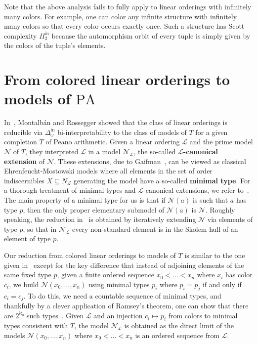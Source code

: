 \documentclass[11pt]{amsart}
\newcommand{\N}{\mathcal{N}}
\newcommand{\mc}[1]{\mathcal{#1}}
\newcommand{\Pinf}[1]{\Pi^{\mathrm{in}}_{#1}}
\newcommand{\Dinf}[1]{\Delta^{\mathrm{in}}_{#1}}
\newcommand{\PA}{\mathrm{PA}}
\def\N{{\mathcal N}}
\theoremstyle{remark}
\newcommand{\define}[1]{\textbf{#1}}
\begin{document}
Note that the above analysis fails to fully apply to linear orderings with infinitely many colors.
For example, one can color any infinite structure with infinitely many colors so that every color occurs exactly once. Such a structure has Scott complexity $\Pinf{2}$ because the automorphism orbit of every tuple is simply given by the colors of the tuple's elements.

\section{From colored linear orderings to models of $\PA$}\label{sec:coloredtomodels}
In~\cite{MR23}, Montalbán and Rossegger showed that the class of linear orderings is reducible via $\Dinf{\omega}$ bi-interpretability to the class of models of $T$ for a given completion $T$ of Peano arithmetic. Given a linear ordering $\mc{L}$ and the prime model $\N$ of $T$, they interpreted $\mc{L}$ in a model $\N_{\mc{L}}$, the so-called \define{$\mc{L}$-canonical extension} of $\N$. These extensions, due to Gaifman~\cite{gaifman1976}, can be viewed as classical Ehrenfeucht-Mostowski models where all elements in the set of order indiscernibles $X\subseteq N_\mc{L}$ generating the model have a so-called \define{minimal type}. For a thorough treatment of minimal types and $\mc{L}$-canonical extensions, we refer to~\cite{KS}. The main property of a minimal type for us is that if $\N(a)$ is such that $a$ has type $p$, then the only proper elementary submodel of $\N(a)$ is $\N$. Roughly speaking, the reduction in~\cite{MR23} is obtained by iteratively extending $\N$ via elements of type $p$, so that in $\N_\mc{L}$ every non-standard element is in the Skolem hull of an element of type $p$. 

Our reduction from colored linear orderings to models of $T$ is similar to the one given in~\cite{MR23} except for the key difference that instead of adjoining elements of the same fixed type $p$, given a finite ordered sequence $x_0<\dots< x_n$ where $x_i$ has color $c_i$, we build $\N(x_0,\dots,x_n)$ using minimal types $p_i$ where $p_i=p_j$ if and only if $c_i=c_j$. To do this, we need a countable sequence of minimal types, and thankfully by a clever application of Ramsey's theorem, one can show that there are $2^{\aleph_0}$ such types~\cite[Theorem 3.1.4]{KS}. 
Given $\mc{L}$ and an injection $c_i\mapsto p_i$ from colors to minimal types consistent with $T$, the model $\N_\mc{L}$ is obtained as the direct limit of the models $\N(x_0,\dots,x_n)$ where $x_0<\dots<x_n$ is an ordered sequence from $\mc L$.
\end{document}
